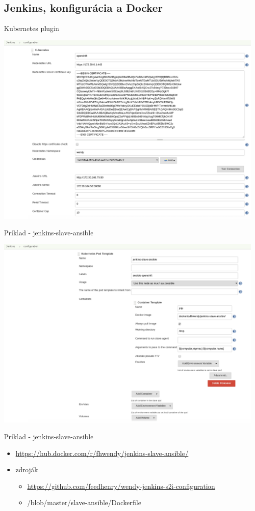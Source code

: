 \documentclass[bigger]{beamer}
\begin{document}
\subsection{Jenkins, konfigurácia a Docker}
\label{sec:org0c0f0b4}
\begin{frame}[label={sec:orgd895b85}]{Kubernetes plugin}
\begin{center}
\includegraphics[width=.9\linewidth]{./026kubernetes.png}
\end{center}
\end{frame}

\begin{frame}[label={sec:orgd966fbc}]{Príklad - jenkins-slave-ansible}
\begin{center}
\includegraphics[width=.9\linewidth]{./027ansible_slave.png}
\end{center}
\end{frame}

\begin{frame}[label={sec:org0290c09}]{Príklad - jenkins-slave-ansible}
\begin{itemize}
\item \url{https://hub.docker.com/r/fhwendy/jenkins-slave-ansible/}
\item zdroják
\begin{itemize}
\item \url{https://github.com/feedhenry/wendy-jenkins-s2i-configuration}
\item /blob/master/slave-ansible/Dockerfile
\end{itemize}
\end{itemize}
\end{frame}
\end{document}
